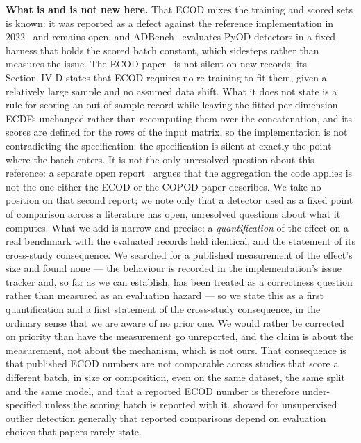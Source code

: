 \documentclass[manuscript,anonymous,review]{acmart}
\begin{document}
\textbf{What is and is not new here.} That ECOD mixes the training and scored
sets is known: it was reported as a defect against the reference implementation
in 2022~\citep{pyod401} and remains open, and ADBench~\citep{han2022adbench}
evaluates PyOD detectors in a fixed harness that holds the scored batch
constant, which sidesteps rather than measures the issue. The ECOD
paper~\citep{li2023ecod} is not silent on new records: its Section~IV-D states
that ECOD requires no re-training to fit them, given a relatively large sample
and no assumed data shift. What it does not state is a rule for scoring an
out-of-sample record while leaving the fitted per-dimension ECDFs unchanged
rather than recomputing them over the concatenation, and its scores are defined
for the rows of the input matrix, so the implementation is not contradicting
the specification: the specification is silent at exactly the point where the
batch enters. It is not the only unresolved question about this reference: a separate
open report~\citep{pyod561} argues that the aggregation the code applies is not
the one either the ECOD or the COPOD paper describes. We take no position on
that second report; we note only that a detector used as a fixed point of
comparison across a literature has open, unresolved questions about what it
computes. What we add is narrow and precise: a \emph{quantification} of the
effect on a real benchmark with the evaluated records held identical, and the
statement of its cross-study consequence. We searched for a published
measurement of the effect's size and found none --- the behaviour is recorded
in the implementation's issue tracker and, so far as we can establish, has been
treated as a correctness question rather than measured as an evaluation
hazard --- so we state this as a first quantification and a first statement of
the cross-study consequence, in the ordinary sense that we are aware of no
prior one. We would rather be corrected on priority than have the measurement
go unreported, and the claim is about the measurement, not about the mechanism,
which is not ours. That consequence is that published
ECOD numbers are not comparable across studies that score a different batch,
in size or composition, even on the same dataset, the same split and the same
model, and that a reported ECOD number is therefore under-specified unless the
scoring batch is reported with it. \citet{campos2016evaluation} showed for
unsupervised outlier detection generally that reported comparisons depend on
evaluation choices that papers rarely state.
\end{document}
